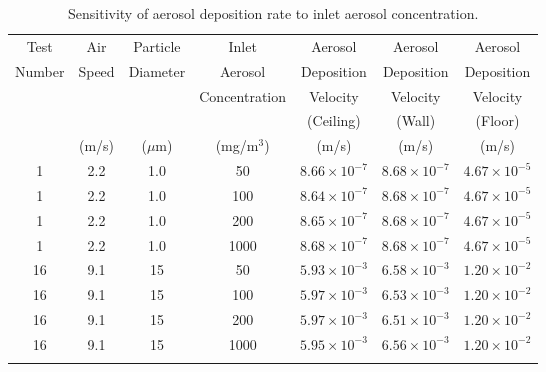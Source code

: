 \begin{table}[!ht]
\caption[Sensitivity of aerosol deposition rate to inlet aerosol concentration]
{Sensitivity of aerosol deposition rate to inlet aerosol concentration.}
\begin{tabular}{ccccccc}
\hline\noalign{\smallskip}
Test      &  Air     &  Particle  &  Inlet          &  Aerosol                &  Aerosol                &  Aerosol                \\
Number    &  Speed   &  Diameter  &  Aerosol        &  Deposition             &  Deposition             &  Deposition             \\
          &          &            &  Concentration  &  Velocity               &  Velocity               &  Velocity               \\
          &          &            &                 &  (Ceiling)              &  (Wall)                 &  (Floor)                \\
          &  (m/s)   &  ($\mu$m)  &  (mg/m$^3$)     &  (m/s)                  &  (m/s)                  &  (m/s)                  \\
\noalign{\smallskip}\hline\noalign{\smallskip}
1         &  2.2     &  1.0       &  50             &  $8.66 \times 10^{-7}$  &  $8.68 \times 10^{-7}$  &  $4.67 \times 10^{-5}$  \\
1         &  2.2     &  1.0       &  100            &  $8.64 \times 10^{-7}$  &  $8.68 \times 10^{-7}$  &  $4.67 \times 10^{-5}$  \\
1         &  2.2     &  1.0       &  200            &  $8.65 \times 10^{-7}$  &  $8.68 \times 10^{-7}$  &  $4.67 \times 10^{-5}$  \\
1         &  2.2     &  1.0       &  1000           &  $8.68 \times 10^{-7}$  &  $8.68 \times 10^{-7}$  &  $4.67 \times 10^{-5}$  \\
16        &  9.1     &  15        &  50             &  $5.93 \times 10^{-3}$  &  $6.58 \times 10^{-3}$  &  $1.20 \times 10^{-2}$  \\
16        &  9.1     &  15        &  100            &  $5.97 \times 10^{-3}$  &  $6.53 \times 10^{-3}$  &  $1.20 \times 10^{-2}$  \\
16        &  9.1     &  15        &  200            &  $5.97 \times 10^{-3}$  &  $6.51 \times 10^{-3}$  &  $1.20 \times 10^{-2}$  \\
16        &  9.1     &  15        &  1000           &  $5.95 \times 10^{-3}$  &  $6.56 \times 10^{-3}$  &  $1.20 \times 10^{-2}$  \\
\noalign{\smallskip}\hline
\end{tabular}
\label{tab:Concentration_Sensitivity}
\end{table}

